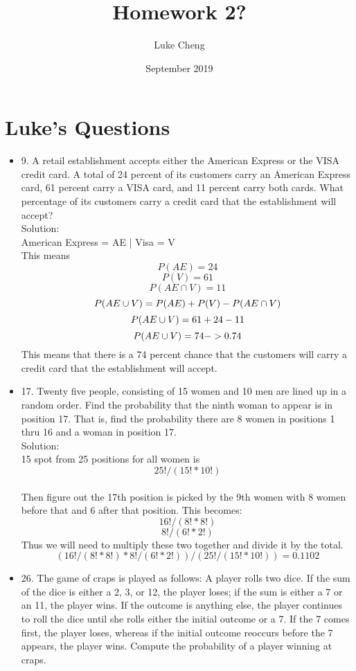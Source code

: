 \documentclass{article}
\title{Homework 2?}
\author{Luke Cheng}
\date{September 2019}
\begin{document}
\maketitle

\section{Luke's Questions}

\begin{itemize}
    \item 9. A retail establishment accepts either the American Express or the VISA credit card. A total of 24 percent of its customers carry an American Express card, 61 percent carry a VISA card, and 11 percent carry both cards. What percentage of its customers carry a credit card that the establishment will accept?
    \\Solution: 
    \\American Express = AE | Visa = V
    \\This means $$P(AE) = 24$$ $$P(V) = 61$$ $$P(AE \cap V) = 11$$
    $$\\P(AE \cup V) = P(AE) + P(V) - P(AE \cap V)$$
    $$\\P(AE \cup V) = 61 + 24 - 11$$
    $$\\P(AE \cup V) = 74 -> 0.74$$
    This means that there is a 74 percent chance that the customers will carry a credit card that the establishment will accept.
    \item 17. Twenty five people, consisting of 15 women and 10 men are lined up in a random order. Find the probability that the ninth woman to appear is in position 17. That is, find the probability there are 8 women in positions 1 thru 16 and a woman in position 17.
    \\Solution: 
    \\15 spot from 25 positions for all women is
    $$25!/(15!*10!)$$
    \\Then figure out the 17th position is picked by the 9th women with 8 women before that and 6 after that position. This becomes:
    $$16!/(8!*8!)$$ $$8!/(6!*2!)$$
    Thus we will need to multiply these two together and divide it by the total.
    $$(16!/(8!*8!) * 8!/(6!*2!))/(25!/(15!*10!)) = 0.1102$$
    \item 26. The game of craps is played as follows: A player rolls two dice. If the sum of the dice is either a 2,
    3, or 12, the player loses; if the sum is either a 7 or an 11, the player wins. If the outcome is anything else, the player continues to roll the dice until she rolls either the initial outcome or a 7. If the 7 comes first, the player loses, whereas if the initial outcome reoccurs before the 7 appears, the player wins. Compute the probability of a player winning at craps.

\end{itemize}
\end{document}
